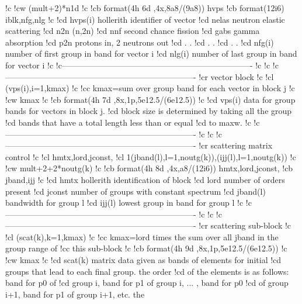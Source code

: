 \begin{ccode}
!c
!cw    (mult+2)*n1d
!c
!cb    format(4h 6d ,4x,8a8/(9a8))      hvps
!cb    format(12i6)                    iblk,nfg,nlg
!c
!cd    hvps(i)     hollerith identifier of vector
!cd                      nelas     neutron elastic scattering
!cd                      n2n       (n,2n)
!cd                      nnf       second chance fission
!cd                      gabs      gamma absorption
!cd                      p2n       protons in, 2 neutrons out
!cd                         .          .
!cd                         .          .
!cd                         .          .
!cd    nfg(i)      number of first group in band for vector i
!cd    nlg(i)      number of last group in band for vector i
!c
!c----------------------------------------------------------------------
!c
!c
!c----------------------------------------------------------------------
!cr          vector block
!c
!cl    (vps(i),i=1,kmax)
!c
!cc    kmax=sum over group band for each vector in block j
!c
!cw    kmax
!c
!cb    format(4h 7d ,8x,1p,5e12.5/(6e12.5))
!c
!cd    vps(i)      data for group bands for vectors in block j.
!cd                block size is determined by taking all the group
!cd                bands that have a total length less than or equal
!cd                to maxw.
!c
!c----------------------------------------------------------------------
!c
!c
!c----------------------------------------------------------------------
!cr        scattering matrix control
!c
!cl    hmtx,lord,jconst,
!cl   1(jband(l),l=1,noutg(k)),(ijj(l),l=1,noutg(k))
!c
!cw    mult+2+2*noutg(k)
!c
!cb    format(4h 8d ,4x,a8/(12i6))      hmtx,lord,jconst,
!cb                                     jband,ijj
!c
!cd    hmtx        hollerith identification of block
!cd    lord        number of orders present
!cd    jconst      number of groups with constant spectrum
!cd    jband(l)    bandwidth for group l
!cd    ijj(l)      lowest group in band for group l
!c
!c----------------------------------------------------------------------
!c
!c
!c----------------------------------------------------------------------
!cr          scattering sub-block
!c
!cl    (scat(k),k=1,kmax)
!c
!cc    kmax=lord times the sum over all jband in the group range of
!cc            this sub-block
!c
!cb    format(4h 9d ,8x,1p,5e12.5/(6e12.5))
!c
!cw    kmax
!c
!cd    scat(k)     matrix data given as bands of elements for initial
!cd                groups that lead to each final group.  the order
!cd                of the elements is as follows:  band for p0 of
!cd                group i, band for p1 of group i, ... , band for p0
!cd                of group i+1, band for p1 of group i+1, etc.  the

\end{ccode}
